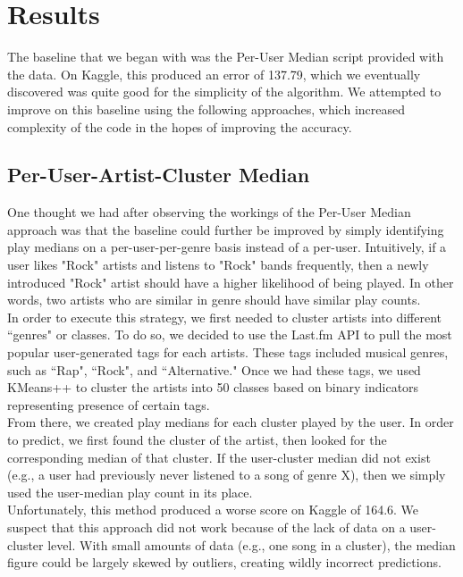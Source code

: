 \documentclass[11pt]{article}
\begin{document}
\clearpage

\section{Results}
The baseline that we began with was the Per-User Median script provided with the data. On Kaggle, this produced an error of 137.79, which we eventually discovered was quite good for the simplicity of the algorithm. We attempted to improve on this baseline using the following approaches, which increased complexity of the code in the hopes of improving the accuracy.

\subsection{Per-User-Artist-Cluster Median}
One thought we had after observing the workings of the Per-User Median approach was that the baseline could further be improved by simply identifying play medians on a per-user-per-genre basis instead of a per-user. Intuitively, if a user likes "Rock" artists and listens to "Rock" bands frequently, then a newly introduced "Rock" artist should have a higher likelihood of being played. In other words, two artists who are similar in genre should have similar play counts. \\

In order to execute this strategy, we first needed to cluster artists into different ``genres" or classes. To do so, we decided to use the Last.fm API to pull the most popular user-generated tags for each artists. These tags included musical genres, such as ``Rap", ``Rock", and ``Alternative." Once we had these tags, we used KMeans++ to cluster the artists into 50 classes based on binary indicators representing presence of certain tags.\\

From there, we created play medians for each cluster played by the user. In order to predict, we first found the cluster of the artist, then looked for the corresponding median of that cluster. If the user-cluster median did not exist (e.g., a user had previously never listened to a song of genre X), then we simply used the user-median play count in its place.\\

Unfortunately, this method produced a worse score on Kaggle of 164.6. We suspect that this approach did not work because of the lack of data on a user-cluster level. With small amounts of data (e.g., one song in a cluster), the median figure could be largely skewed by outliers, creating wildly incorrect predictions.
\end{document}
